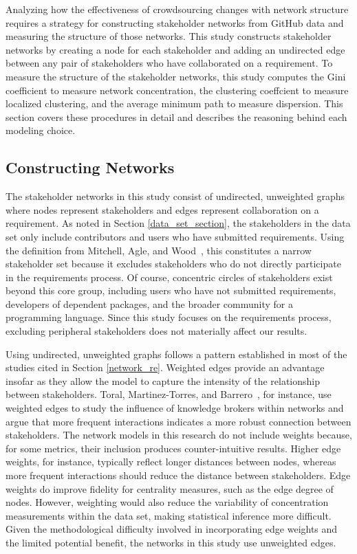 Analyzing how the effectiveness of crowdsourcing changes with network structure requires a strategy for constructing stakeholder networks from GitHub data and measuring the structure of those networks. This study constructs stakeholder networks by creating a node for each stakeholder and adding an undirected edge between any pair of stakeholders who have collaborated on a requirement. To measure the structure of the stakeholder networks, this study computes the Gini coefficient to measure network concentration, the clustering coeffcient to measure localized clustering, and the average minimum path to measure dispersion. This section covers these procedures in detail and describes the reasoning behind each modeling choice.

\subsection{Constructing Networks}
\label{network_section}

The stakeholder networks in this study consist of undirected, unweighted graphs where nodes represent stakeholders and edges represent collaboration on a requirement. As noted in Section \ref{data_set_section}, the stakeholders in the data set only include contributors and users who have submitted requirements. Using the definition from Mitchell, Agle, and Wood~\cite{mitchell}, this constitutes a narrow stakeholder set because it excludes stakeholders who do not directly participate in the requirements process. Of course, concentric circles of stakeholders exist beyond this core group, including users who have not submitted requirements, developers of dependent packages, and the broader community for a programming language. Since this study focuses on the requirements process, excluding peripheral stakeholders does not materially affect our results.

Using undirected, unweighted graphs follows a pattern established in most of the studies cited in Section \ref{network_re}. Weighted edges provide an advantage insofar as they allow the model to capture the intensity of the relationship between stakeholders. Toral, Martinez-Torres, and Barrero~\cite{toral}, for instance, use weighted edges to study the influence of knowledge brokers within networks and argue that more frequent interactions indicates a more robust connection between stakeholders. The network models in this research do not include weights because, for some metrics, their inclusion produces counter-intuitive results. Higher edge weights, for instance, typically reflect longer distances between nodes, whereas more frequent interactions should reduce the distance between stakeholders. Edge weights do improve fidelity for centrality measures, such as the edge degree of nodes. However, weighting would also reduce the variability of concentration measurements within the data set, making statistical inference more difficult. Given the methodological difficulty involved in incorporating edge weights and the limited potential benefit, the networks in this study use unweighted edges.

